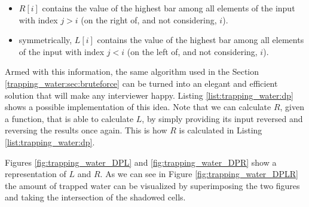 \begin{itemize}
	\item $R[i]$ contains the value of the highest bar among all elements of the input with index $j > i$ (on the right of, and not considering, $i$).
	\item symmetrically, $L[i]$ contains the value of the highest bar among all elements of the input with index $j < i$ (on the left of, and not considering, $i$).
\end{itemize}

Armed with this information, the same algorithm used in the Section \ref{trapping_water:sec:bruteforce} can be turned into an elegant and efficient solution that will make any interviewer happy. Listing \ref{list:trapping_water:dp} shows a possible implementation of this idea. Note that we can calculate $R$, given a function,  that is able to calculate $L$, by simply providing its input reversed and reversing the results once again. This is how $R$ is calculated in Listing \ref{list:trapping_water:dp}.

Figures \ref{fig:trapping_water_DPL} and \ref{fig:trapping_water_DPR} show a representation of $L$ and $R$. As we can see in Figure \ref{fig:trapping_water_DPLR} the amount of trapped water can be visualized by superimposing the two figures and taking the intersection of the shadowed cells.


